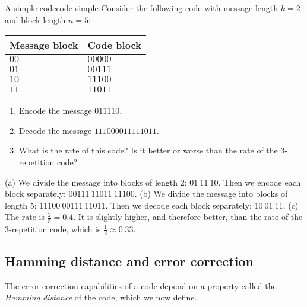 \begin{example}{A simple code}{code-simple}
  Consider the following code with message length $k=2$ and block
  length $n=5$:
  \begin{center}
    \begin{tabular}{|l|l|}
      \hline
      Message block & Code block \\\hline
      $00$ & $00000$ \\
      $01$ & $00111$ \\
      $10$ & $11100$ \\
      $11$ & $11011$ \\\hline
    \end{tabular}
  \end{center}
  \begin{enumialphparenastyle}
    \begin{enumerate}
    \item Encode the message $011110$.
    \item Decode the message $111000011111011$.
    \item What is the rate of this code? Is it better or worse than
      the rate of the 3-repetition code?
    \end{enumerate}
  \end{enumialphparenastyle}
\end{example}

\begin{solution}
  (a) We divide the message into blocks of length $2$:
  $01~11~10$. Then we encode each block separately:
  $00111~11011~11100$. (b) We divide the message into blocks of length
  $5$: $11100~00111~11011$. Then we decode each block separately:
  $10~01~11$. (c) The rate is $\frac{2}{5}=0.4$. It is slightly
  higher, and therefore better, than the rate of the 3-repetition code,
  which is $\frac{1}{3}\approx 0.33$.
\end{solution}

\subsection*{Hamming distance and error correction}

The error correction capabilities of a code depend on a property
called the \textit{Hamming distance} of the code, which we now define.

